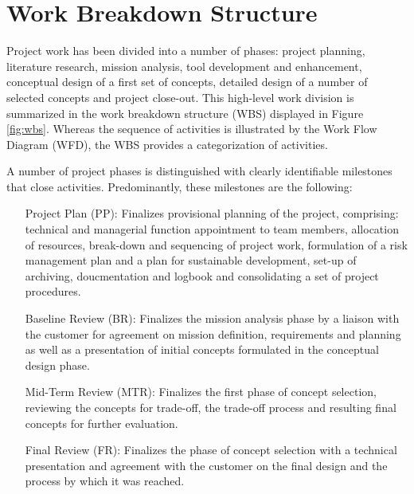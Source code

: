 \section{Work Breakdown Structure}\label{cha:WBS}
Project work has been divided into a number of phases: project planning, literature research, mission analysis, tool development and enhancement, conceptual design of a first set of concepts, detailed design of a number of selected concepts and project close-out. This high-level work division is summarized in the work breakdown structure (WBS) displayed in Figure \ref{fig:wbs}. Whereas the sequence of activities is illustrated by the Work Flow Diagram (WFD), the WBS provides a categorization of activities. 

A number of project phases is distinguished with clearly identifiable milestones that close activities. Predominantly, these milestones are the following:
\begin{itemize}
\item[Project Plan (PP):] Finalizes provisional planning of the project, comprising: technical and managerial function appointment to team members, allocation of resources, break-down and sequencing of project work, formulation of a risk management plan and a plan for sustainable development, set-up of archiving, doucmentation and logbook and consolidating a set of project procedures.
\item[Baseline Review (BR):] Finalizes the mission analysis phase by a liaison with the customer for agreement on mission definition, requirements and planning as well as a presentation of initial concepts formulated in the conceptual design phase.
\item[Mid-Term Review (MTR):] Finalizes the first phase of concept selection, reviewing the concepts for trade-off, the trade-off process and resulting final concepts for further evaluation.
\item[Final Review (FR):] Finalizes the phase of concept selection with a technical presentation and agreement with the customer on the final design and the process by which it was reached. 
\end{itemize}

